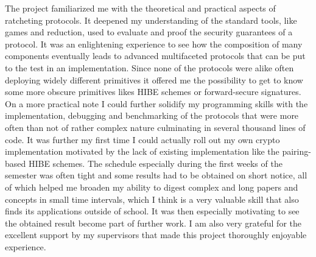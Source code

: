 \documentclass[11pt,a4paper,twoside,openright,bibliography=totoc]{scrbook}
\begin{document}
The project familiarized me with the theoretical and practical aspects
of ratcheting protocols.  It deepened my understanding of the standard
tools, like games and reduction, used to evaluate and proof the
security guarantees of a protocol. It was an enlightening experience
to see how the composition of many components eventually leads to
advanced multifaceted protocols that can be put to the test in an
implementation. Since none of the protocols were alike often deploying
widely different primitives it offered me the possibility to get to
know some more obscure primitives likes HIBE schemes or forward-secure
signatures. On a more practical note I could further solidify my
programming skills with the implementation, debugging and benchmarking
of the protocols that were more often than not of rather complex
nature culminating in several thousand lines of code. It was further
my first time I could actually roll out my own crypto implementation
motivated by the lack of existing implementation like the
pairing-based HIBE schemes. The schedule especially during the first
weeks of the semester was often tight and some results had to be
obtained on short notice, all of which helped me broaden my ability to
digest complex and long papers and concepts in small time intervals, which
I think is a very valuable skill that also finds its applications outside of
school. It was then especially motivating to see the obtained result
become part of further work. I am also very grateful for the excellent
support by my supervisors that made this project thoroughly enjoyable
experience.




\listoffigures
\end{document}
